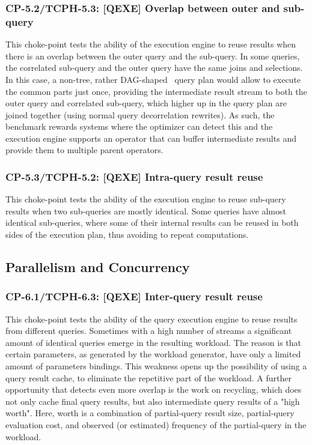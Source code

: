 \subsubsection{CP-5.2/TCPH-5.3: [QEXE] Overlap between outer and sub-query}
\label{choke_point_5.2}
This choke-point tests the ability of the execution engine to reuse results when there is an overlap between the outer query and the sub-query. In some queries, the correlated sub-query and the outer query have the same joins and selections.
In this case, a non-tree, rather DAG-shaped~\cite{DBLP:conf/btw/NeumannM09} query plan would allow to execute the common parts just once, providing the intermediate result stream to both the outer query and correlated sub-query,
which higher up in the query plan are joined together (using normal query decorrelation rewrites).
As such, the benchmark rewards systems where the optimizer can detect this and the execution engine supports an operator that can buffer intermediate results and provide them to multiple parent operators.

\subsubsection{CP-5.3/TCPH-5.2: [QEXE] Intra-query result reuse}
\label{choke_point_5.3}
This choke-point tests the ability of the execution engine to reuse sub-query results when two sub-queries are mostly identical.
Some queries have almost identical sub-queries, where some of their internal results can be reused in both sides of the execution plan, thus avoiding to repeat computations.


\subsection{Parallelism and Concurrency}

\subsubsection{CP-6.1/TCPH-6.3: [QEXE] Inter-query result reuse}
\label{choke_point_6.1}
This choke-point tests the ability of the query execution engine to reuse results from different queries. Sometimes with a high number of streams a significant amount of identical queries emerge in the resulting workload.
The reason is that certain parameters, as generated by the workload generator, have only a limited amount of parameters bindings.
This weakness opens up the possibility of using a query result cache, to eliminate the repetitive part of the workload.
A further opportunity that detects even more overlap is the work on recycling, which does not only cache final query results, but also intermediate query results of a "high worth".
Here, worth is a combination of partial-query result size, partial-query evaluation cost, and observed (or estimated) frequency of the partial-query in the workload.

